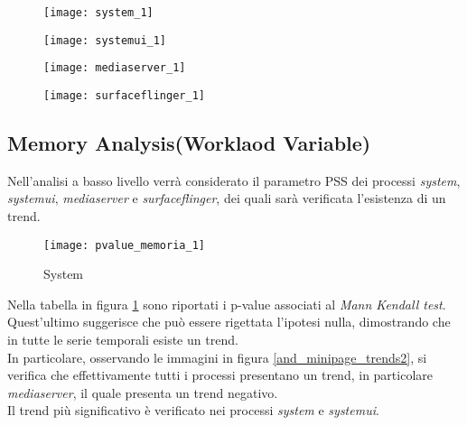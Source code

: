 \begin{minipage}{\linewidth}
  \centering
  \begin{minipage}{0.49\linewidth}
    \begin{figure}[H]
      \texttt{[image: system\_1]}
    \end{figure}
  \end{minipage}
  \begin{minipage}{0.49\linewidth}
    \begin{figure}[H]
      \texttt{[image: systemui\_1]}
    \end{figure}
  \end{minipage}
  \begin{minipage}{0.49\linewidth}
    \begin{figure}[H]
      \texttt{[image: mediaserver\_1]}
    \end{figure}
  \end{minipage}
  \begin{minipage}{0.49\linewidth}
    \begin{figure}[H]
      \texttt{[image: surfaceflinger\_1]}
    \end{figure}
  \end{minipage}
\end{minipage}
\label{and_minipage_trends}

\clearpage
\subsection{Memory Analysis(Worklaod Variable)}

Nell'analisi a basso livello verrà considerato il parametro PSS dei processi \textit{system},
\textit{systemui}, \textit{mediaserver} e \textit{surfaceflinger}, dei quali
sarà verificata l'esistenza di un trend.\\

\begin{figure}[!htbp]
  \centering
  \texttt{[image: pvalue\_memoria\_1]}
  \caption{System}
  \label{and_pvalue_memoria_1}
\end{figure}

Nella tabella in figura \ref{and_pvalue_memoria_1} sono riportati i p-value associati
al \textit{Mann Kendall test}.\\
Quest'ultimo suggerisce che può essere rigettata l'ipotesi nulla, dimostrando
che in tutte le serie temporali esiste un trend.\\
In particolare, osservando le immagini in figura \ref{and_minipage_trends2}, si verifica che effettivamente
tutti i processi presentano un trend, in particolare \textit{mediaserver},
il quale presenta un trend negativo.\\
Il trend più significativo è verificato nei processi \textit{system} e \textit{systemui}.

